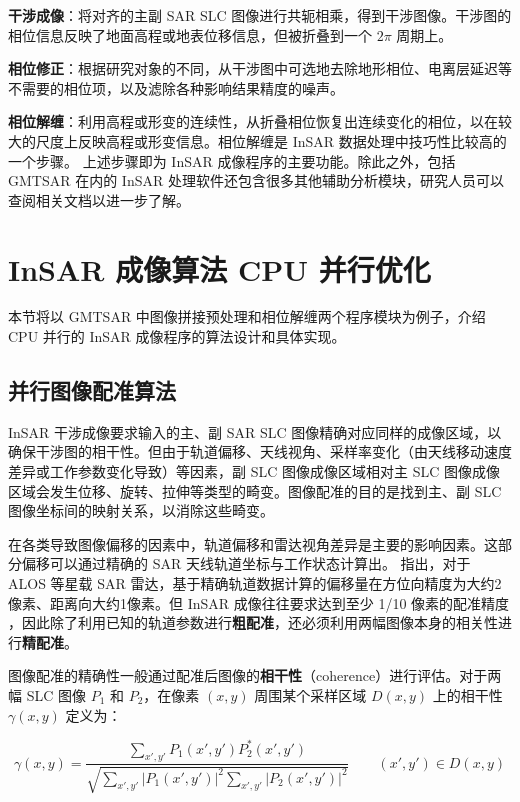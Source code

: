 \textbf{干涉成像}：将对齐的主副 SAR SLC 图像进行共轭相乘，得到干涉图像。干涉图的相位信息反映了地面高程或地表位移信息，但被折叠到一个 $2\pi$ 周期上。

\textbf{相位修正}：根据研究对象的不同，从干涉图中可选地去除地形相位、电离层延迟等不需要的相位项，以及滤除各种影响结果精度的噪声。

\textbf{相位解缠}：利用高程或形变的连续性，从折叠相位恢复出连续变化的相位，以在较大的尺度上反映高程或形变信息。相位解缠是 InSAR 数据处理中技巧性比较高的一个步骤。
上述步骤即为 InSAR 成像程序的主要功能。除此之外，包括 GMTSAR 在内的 InSAR 处理软件还包含很多其他辅助分析模块，研究人员可以查阅相关文档以进一步了解。


\section{InSAR 成像算法 CPU 并行优化}

本节将以 GMTSAR 中图像拼接预处理和相位解缠两个程序模块为例子，介绍 CPU 并行的 InSAR 成像程序的算法设计和具体实现。

\subsection{并行图像配准算法}

InSAR 干涉成像要求输入的主、副 SAR SLC 图像精确对应同样的成像区域，以确保干涉图的相干性。但由于轨道偏移、天线视角、采样率变化（由天线移动速度差异或工作参数变化导致）等因素，副 SLC 图像成像区域相对主 SLC 图像成像区域会发生位移、旋转、拉伸等类型的畸变。图像配准的目的是找到主、副 SLC 图像坐标间的映射关系，以消除这些畸变。

在各类导致图像偏移的因素中，轨道偏移和雷达视角差异是主要的影响因素。这部分偏移可以通过精确的 SAR 天线轨道坐标与工作状态计算出。\citet{sandwell2011gmtsar} 指出，对于 ALOS 等星载 SAR 雷达，基于精确轨道数据计算的偏移量在方位向精度为大约2像素、距离向大约1像素。但 InSAR 成像往往要求达到至少 1/10 像素的配准精度 \cite{li2008image}，因此除了利用已知的轨道参数进行\textbf{粗配准}，还必须利用两幅图像本身的相关性进行\textbf{精配准}。

图像配准的精确性一般通过配准后图像的\textbf{相干性}（coherence）进行评估。对于两幅 SLC 图像 $P_1$ 和 $P_2$，在像素 $(x, y)$ 周围某个采样区域 $D(x, y)$ 上的相干性 $\gamma(x, y)$ 定义为：

\begin{equation}
    \gamma(x, y) = \frac{\sum_{x', y'} P_1(x', y') P_2^*(x', y')}{\sqrt{\sum_{x', y'}|P_1(x', y')|^2 \sum_{x', y'}|P_2(x', y')|^2}} \qquad (x', y') \in D(x, y)
    \label{eq:coherence}
\end{equation}


